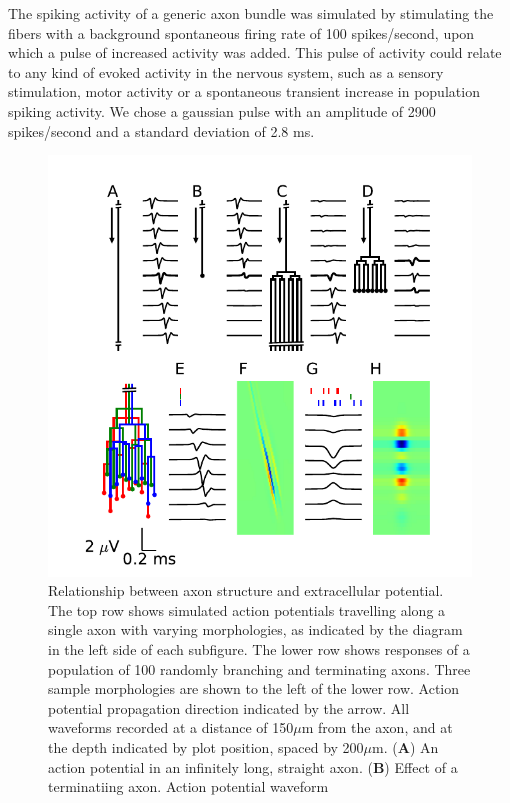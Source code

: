 \documentclass[]{article}
\begin{document}
The spiking activity of a generic axon bundle was simulated by
stimulating the fibers with a background spontaneous firing rate of 100
spikes/second, upon which a pulse of increased activity was added. This
pulse of activity could relate to any kind of evoked activity in the
nervous system, such as a sensory stimulation, motor activity or a
spontaneous transient increase in population spiking activity. We chose
a gaussian pulse with an amplitude of 2900 spikes/second and a standard
deviation of 2.8 ms.

\begin{figure}[htbp]
\centering
\includegraphics{../figs/fig_1.pdf}
\caption{\label{fig:simpletree}Relationship between axon structure and
extracellular potential. The top row shows simulated action potentials
travelling along a single axon with varying morphologies, as indicated
by the diagram in the left side of each subfigure. The lower row shows
responses of a population of 100 randomly branching and terminating
axons. Three sample morphologies are shown to the left of the lower row.
Action potential propagation direction indicated by the arrow. All
waveforms recorded at a distance of 150\(\mu\)m from the axon, and at
the depth indicated by plot position, spaced by 200\(\mu\)m.
(\textbf{A}) An action potential in an infinitely long, straight axon.
(\textbf{B}) Effect of a terminatiing axon. Action potential waveform
}
\end{figure}
\end{document}
